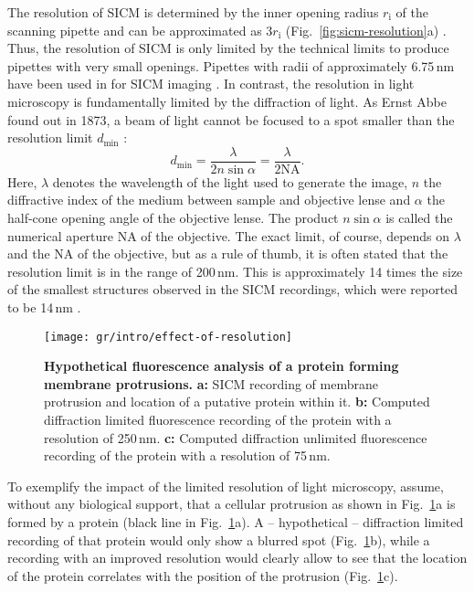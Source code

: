 The resolution of SICM is determined by the inner opening radius
$r_\mathrm{i}$ of the scanning pipette and can be approximated as
$3r_\mathrm{i}$ (Fig.~\ref{fig:sicm-resolution}a)
\cite{rheinlaender:094905,Rheinlaender2015}.  Thus, the resolution of SICM is
only limited by the technical limits to produce pipettes with very small
openings. Pipettes with radii of approximately 6.75\,nm have been used in for
SICM imaging \cite{Shevchuk2006}. In
contrast, the resolution in light microscopy is fundamentally limited by the
diffraction of light. As Ernst Abbe found out in 1873, a beam of light cannot
be focused to a spot smaller than the resolution limit $d_\text{min}$
\cite{Abbe1873}:
\begin{equation}
  d_\text{min} = \frac\lambda{2n\sin\alpha} = \frac\lambda{2\mathrm{NA}}\text{.}
  \label{eq:diffraction-limit}
\end{equation}
Here, $\lambda$ denotes the wavelength of the light used to generate the
image, $n$ the diffractive index of the medium between sample and objective
lense and $\alpha$ the half-cone opening angle of the objective lense. The
product $n\sin\alpha$ is called the numerical aperture $\mathrm{NA}$ of the
objective. The exact limit, of course, depends on $\lambda$ and the NA of the
objective, but as a rule of thumb, it is often stated that the resolution
limit is in the range of 200\,nm. This is approximately 14 times the size of
the smallest structures observed in the SICM recordings, which were reported to be 14\,nm
\cite{Shevchuk2006}.

\begin{figure}
  \centering
  \texttt{[image: gr/intro/effect-of-resolution]}%
  \caption{\textbf{Hypothetical fluorescence analysis of a protein forming
      membrane protrusions.} \textbf{a:} SICM recording of membrane protrusion
    and location of a putative protein within it. \textbf{b:} Computed
    diffraction limited fluorescence recording of the protein with a resolution
    of 250\,nm. \textbf{c:} Computed
    diffraction unlimited fluorescence recording of the protein with a
    resolution of 75\,nm.}
  \label{fig:sicm-and-light-resolution}
\end{figure}

To exemplify the impact of the limited resolution of light microscopy, assume,
without any biological support, that a cellular protrusion as shown in
Fig.~\ref{fig:sicm-and-light-resolution}a is formed by a protein (black line
in Fig.~\ref{fig:sicm-and-light-resolution}a). A -- hypothetical --
diffraction limited recording of that protein would only show a blurred spot
(Fig.~\ref{fig:sicm-and-light-resolution}b), while a recording with an
improved resolution would clearly allow to see that the location of the
protein correlates with the position of the protrusion
(Fig.~\ref{fig:sicm-and-light-resolution}c). 

